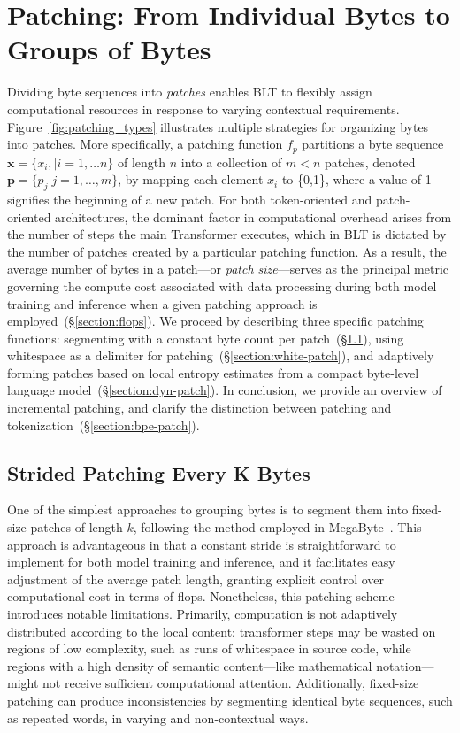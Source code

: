 \section{Patching: From Individual Bytes to Groups of Bytes}
\label{section:patching}

Dividing byte sequences into \textit{patches} enables {\textsc BLT} to flexibly assign computational resources in response to varying contextual requirements. Figure~\ref{fig:patching_types} illustrates multiple strategies for organizing bytes into patches. More specifically, a patching function $f_p$ partitions a byte sequence $\pmb{x}=\{x_i,|i=1,\ldots n\}$ of length $n$ into a collection of $m < n$ patches, denoted $\pmb{p}=\{p_j|j=1,\ldots,m\}$, by mapping each element $x_i$ to \{0,1\}, where a value of 1 signifies the beginning of a new patch. For both token-oriented and patch-oriented architectures, the dominant factor in computational overhead arises from the number of steps the main Transformer executes, which in {\textsc BLT} is dictated by the number of patches created by a particular patching function. As a result, the average number of bytes in a patch—or \textit{patch size}—serves as the principal metric governing the compute cost associated with data processing during both model training and inference when a given patching approach is employed~(\S\ref{section:flops}).
We proceed by describing three specific patching functions: segmenting with a constant byte count per patch~(\S\ref{section:static-patch}), using whitespace as a delimiter for patching~(\S\ref{section:white-patch}), and adaptively forming patches based on local entropy estimates from a compact byte-level language model~(\S\ref{section:dyn-patch}). In conclusion, we provide an overview of incremental patching, and clarify the distinction between patching and tokenization~(\S\ref{section:bpe-patch}).

\subsection{Strided Patching Every K Bytes}
\label{section:static-patch}

One of the simplest approaches to grouping bytes is to segment them into fixed-size patches of length $k$, following the method employed in MegaByte~\citep{yu2023megabyte}. This approach is advantageous in that a constant stride is straightforward to implement for both model training and inference, and it facilitates easy adjustment of the average patch length, granting explicit control over computational cost in terms of flops. Nonetheless, this patching scheme introduces notable limitations. Primarily, computation is not adaptively distributed according to the local content: transformer steps may be wasted on regions of low complexity, such as runs of whitespace in source code, while regions with a high density of semantic content—like mathematical notation—might not receive sufficient computational attention. Additionally, fixed-size patching can produce inconsistencies by segmenting identical byte sequences, such as repeated words, in varying and non-contextual ways.

